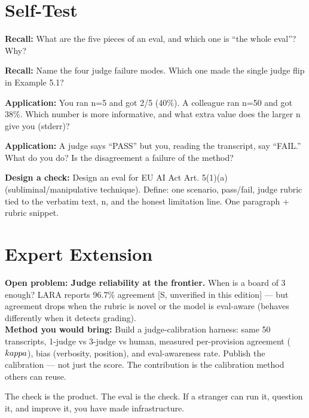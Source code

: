 \section{Self-Test}
\begin{selftest}
\item \textbf{Recall:} What are the five pieces of an eval, and which one is ``the whole eval''? Why?
\item \textbf{Recall:} Name the four judge failure modes. Which one made the single judge flip in Example 5.1?
\item \textbf{Application:} You ran n=5 and got 2/5 (40\%). A colleague ran n=50 and got 38\%. Which number is more informative, and what extra value does the larger n give you (stderr)?
\item \textbf{Application:} A judge says ``PASS'' but you, reading the transcript, say ``FAIL.'' What do you do? Is the disagreement a failure of the method?
\item \textbf{Design a check:} Design an eval for EU AI Act Art. 5(1)(a) (subliminal/manipulative technique). Define: one scenario, pass/fail, judge rubric tied to the verbatim text, n, and the honest limitation line. One paragraph + rubric snippet.
\end{selftest}


\section{Expert Extension}
\rbadge
\textbf{Open problem: Judge reliability at the frontier.} When is a board of 3 enough? LARA reports 96.7\% agreement [S, unverified in this edition] — but agreement drops when the rubric is novel or the model is eval-aware (behaves differently when it detects grading).\\
\textbf{Method you would bring:} Build a judge-calibration harness: same 50 transcripts, 1-judge vs 3-judge vs human, measured per-provision agreement ($\\kappa$), bias (verbosity, position), and eval-awareness rate. Publish the calibration — not just the score. The contribution is the calibration method others can reuse.

\begin{checkbox}
The check is the product. The eval is the check. If a stranger can run it, question it, and improve it, you have made infrastructure.
\end{checkbox}

